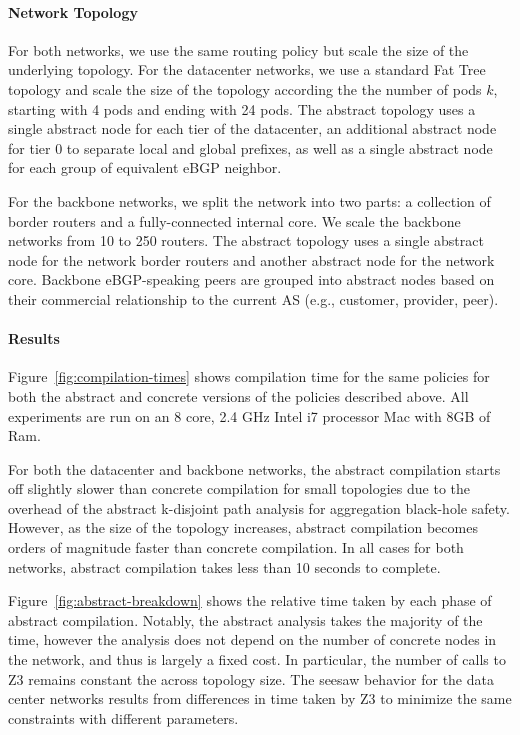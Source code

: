 \documentclass{sig-alternate-10pt}
\newcommand{\para}[1]{\paragraph*{\textbf{#1}}}
\begin{document}
\para{Network Topology}

For both networks, we use the same routing policy but scale the size of the underlying topology. For the datacenter networks, we use a standard Fat Tree topology and scale the size of the topology according the the number of pods $k$, starting with 4 pods and ending with 24 pods. The abstract topology uses a single abstract node for each tier of the datacenter, an additional abstract node for tier 0 to separate local and global prefixes, as well as a single abstract node for each group of equivalent eBGP neighbor.

For the backbone networks, we split the network into two parts: a collection of border routers and a fully-connected internal core. We scale the backbone networks from 10 to 250 routers. The abstract topology uses a single abstract node for the network border routers and another abstract node for the network core. Backbone eBGP-speaking peers are grouped into abstract nodes based on their commercial relationship to the current AS (e.g., customer, provider, peer).

\para{Results}

Figure~\ref{fig:compilation-times} shows compilation time for the same policies for both the abstract and concrete versions of the policies described above. All experiments are run on an 8 core, 2.4 GHz Intel i7 processor Mac with 8GB of Ram.

For both the datacenter and backbone networks, the abstract compilation starts off slightly slower than concrete compilation for small topologies due to the overhead of the abstract k-disjoint path analysis for aggregation black-hole safety. However, as the size of the topology increases, abstract compilation becomes orders of magnitude faster than concrete compilation. In all cases for both networks, abstract compilation takes less than 10 seconds to complete.

Figure~\ref{fig:abstract-breakdown} shows the relative time taken by each phase of abstract compilation. Notably, the abstract analysis takes the majority of the time, however the analysis does not depend on the number of concrete nodes in the network, and thus is largely a fixed cost. In particular, the number of calls to Z3 remains constant the across topology size. The seesaw behavior for the data center networks results from differences in time taken by Z3 to minimize the same constraints with different parameters.




%
%
%
%
\end{document}
